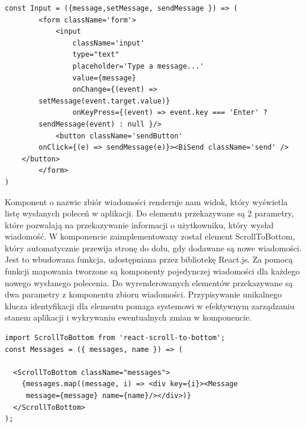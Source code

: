 \newpage
\begin{lstlisting}[caption=Implementacja komponentu komunikacji ]
const Input = ({message,setMessage, sendMessage }) => (
        <form className='form'>
            <input 
                className='input'
                type="text"
                placeholder='Type a message...'
                value={message}
                onChange={(event) => 
		setMessage(event.target.value)}
                onKeyPress={(event) => event.key === 'Enter' ?
	 	sendMessage(event) : null }/>
            <button className='sendButton' 
		onClick={(e) => sendMessage(e)}><BiSend className='send' />
	</button>
        </form>
)
\end{lstlisting}

Komponent o nazwie zbiór wiadomości renderuje nam widok, który wyświetla listę wysłanych poleceń w aplikacji. Do elementu przekazywane są 2 parametry, które pozwalają na przekazywanie informacji o użytkowniku, który wysłał wiadomość. W komponencie zaimplementowany został element ScrollToBottom, który automatycznie przewija stronę do dołu, gdy dodawane są nowe wiadomości. Jest to wbudowana funkcja, udostępniana przez bibliotekę React.js. Za pomocą funkcji mapowania tworzone są  komponenty pojedynczej wiadomości dla każdego nowego wysłanego polecenia. Do wyrenderowanych elementów przekazywane są dwa parametry z komponentu zbioru wiadomości. Przypisywanie unikalnego klucza identyfikacji dla elementu pomaga systemowi w efektywnym zarządzaniu stanem aplikacji i wykrywaniu ewentualnych zmian w komponencie. 
\begin{lstlisting}[caption=Implementacja komponentu zbior wiadomosci ]
import ScrollToBottom from 'react-scroll-to-bottom';
const Messages = ({ messages, name }) => (
  
  <ScrollToBottom className="messages">
    {messages.map((message, i) => <div key={i}><Message
	 message={message} name={name}/></div>)}
  </ScrollToBottom>
);
\end{lstlisting}

